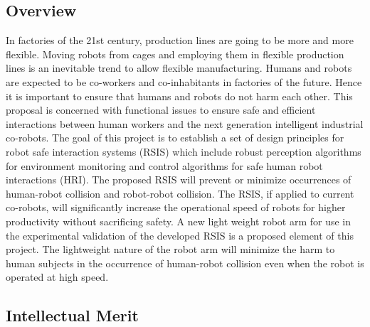 \subsection{Overview}
In factories of the 21st century, production lines are going to be more and more flexible. Moving robots from cages and employing them in flexible production lines is an inevitable trend to allow flexible manufacturing. Humans and robots are expected to be co-workers and co-inhabitants in factories of the future. Hence it is important to ensure that humans and robots do not harm each other. This proposal is concerned with functional issues to ensure safe and efficient interactions between human workers and the next generation intelligent industrial co-robots.
The goal of this project is to establish a set of design principles for robot safe interaction systems (RSIS) which include robust perception algorithms for environment monitoring and control algorithms for safe human robot interactions (HRI). The proposed RSIS will prevent or minimize occurrences of human-robot collision and robot-robot collision. The RSIS, if applied to current co-robots, will significantly increase the operational speed of robots for higher productivity without sacrificing safety. A new light weight robot arm for use in the experimental validation of the developed RSIS is a proposed element of this project. The lightweight nature of the robot arm will minimize the harm to human subjects in the occurrence of human-robot collision even when the robot is operated at high speed.


\subsection{Intellectual Merit}


